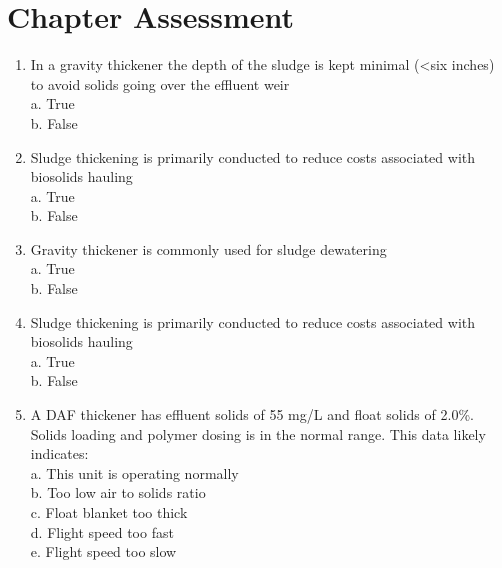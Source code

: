 \section*{Chapter Assessment}
\begin{tcolorbox}[breakable, enhanced,
colframe=blue!25,
colback=blue!10,
coltitle=blue!20!black,  
title= Chapter Assessment]

\begin{enumerate}


\item  In a gravity thickener the depth of the sludge is kept minimal (<six inches) to avoid solids going over the effluent weir \\

a. True \\
b. False \\

\item  Sludge thickening is primarily conducted to reduce costs associated with biosolids hauling\\


a. True \\
b. False \\


\item  Gravity thickener is commonly used for sludge dewatering \\

a. True \\
b. False \\

\item  Sludge thickening is primarily conducted to reduce costs associated with biosolids hauling \\

a. True \\
b. False \\
\item A DAF thickener has effluent solids of 55 mg/L and float solids of 2.0\%. Solids loading and polymer dosing is in the normal range. This data likely indicates: \\

a. This unit is operating normally \\
b. Too low air to solids ratio \\
c. Float blanket too thick \\
d. Flight speed too fast \\
e. Flight speed too slow \\


\end{enumerate}
\end{tcolorbox}
